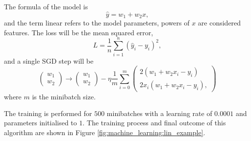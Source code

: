 The formula of the model is
\begin{equation}
    \hat{y} = w_{1} + w_{2}x,
\end{equation}
and the term linear refers to the model parameters, powers of $x$ are considered features. 
The loss will be the mean squared error,
\begin{equation}
    L = \frac{1}{n}\sum_{i=1}^{n}(\hat{y}_{i}-y_{i})^{2},
\end{equation} 
and a single SGD step will be 
\begin{equation}
    \begin{pmatrix}
        w_{1} \\
        w_{2}
    \end{pmatrix} \rightarrow
    \begin{pmatrix}
        w_{1} \\
        w_{2}
    \end{pmatrix} - \eta
    \frac{1}{m}\sum_{i=0}^{m}
    \begin{pmatrix}
        2(w_{1}+w_{2}x_{i} - y_{i})\\
        2x_{i}(w_{1}+w_{2}x_{i} - y_{i}),
    \end{pmatrix}
\end{equation}
where $m$ is the minibatch size.

The training is performed for $500$ minibatches with a learning rate of $0.0001$ and parameters initialised to $1$. The training process and final outcome of this algorithm are shown in Figure \ref{fig:machine_learning:lin_example}.

